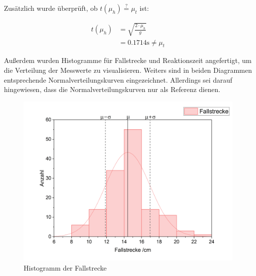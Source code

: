 \documentclass[a4paper,12pt]{article}
\begin{document}
Zusätzlich wurde überprüft, ob $t(\mu_h)\stackrel{?}{=}\mu_t$ ist:

\begin{align*}
    t(\mu_h) &= \sqrt{\frac{2 \cdot \mu_h}{g}} \\
    &= 0.1714\mathrm{s} \neq \mu_t
\end{align*}

Außerdem wurden Histogramme für Fallstrecke und Reaktionszeit angefertigt, um die Verteilung
der Messwerte zu visualisieren. Weiters sind in beiden Diagrammen entsprechende Normalverteilungskurven
eingezeichnet. Allerdings sei darauf hingewiesen, dass die Normalverteilungskurven nur als Referenz dienen.

\begin{figure}[H]
    \label{Abb:HistogrammFallstrecke}
    \centering
    \includegraphics[width=15cm]{bilder/HistogrammFallstrecke.png}      %
    \caption{Histogramm der Fallstrecke}                                %
\end{figure}

\vfill
\end{document}
